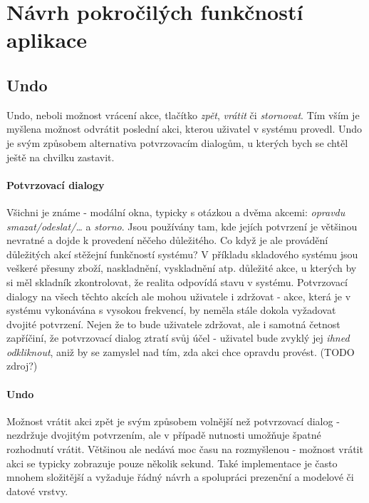 \section{Návrh pokročilých funkčností aplikace}

\subsection{Undo}

Undo, neboli možnost vrácení akce, tlačítko \emph{zpět}, \emph{vrátit} či \emph{stornovat}. Tím vším je myšlena možnost odvrátit poslední akci, kterou uživatel v systému provedl. Undo je svým způsobem alternativa potvrzovacím dialogům, u kterých bych se chtěl ještě na chvilku zastavit.

\paragraph{Potvrzovací dialogy} Všichni je známe - modální okna, typicky s otázkou a dvěma akcemi: \emph{opravdu smazat/odeslat/\ldots} a \emph{storno}. Jsou používány tam, kde jejích potvrzení je většinou nevratné a dojde k provedení něčeho důležitého. Co když je ale provádění důležitých akcí stěžejní funkčností systému? V příkladu skladového systému jsou veškeré přesuny zboží, naskladnění, vyskladnění atp. důležité akce, u kterých by si měl skladník zkontrolovat, že realita odpovídá stavu v systému. Potvrzovací dialogy na všech těchto akcích ale mohou uživatele i zdržovat - akce, která je v systému vykonávána s vysokou frekvencí, by neměla stále dokola vyžadovat dvojité potvrzení. Nejen že to bude uživatele zdržovat, ale i samotná četnost zapříčiní, že potvrzovací dialog ztratí svůj účel - uživatel bude zvyklý jej \emph{ihned odkliknout}, aniž by se zamyslel nad tím, zda akci chce opravdu provést. (TODO zdroj?)

\paragraph{Undo} Možnost vrátit akci zpět je svým způsobem volnější než potvrzovací dialog - nezdržuje dvojitým potvrzením, ale v případě nutnosti umožňuje špatné rozhodnutí vrátit. Většinou ale nedává moc času na rozmyšlenou - možnost vrátit akci se typicky zobrazuje pouze několik sekund. Také implementace je často mnohem složitější a vyžaduje řádný návrh a spolupráci prezenční a modelové či datové vrstvy.

